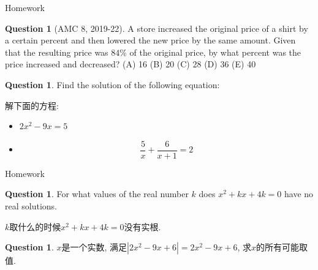 \documentclass{beamer}
\theoremstyle{definition}
\newtheorem{ques}[defn]{Question}
\begin{document}


\begin{frame}{Homework}
    \begin{ques}[AMC 8, 2019-22]
        A store increased the original price of a shirt by a certain percent and then lowered the new price by the same amount. Given that the resulting price was $84 \%$ of the original price, by what percent was the price increased and decreased?
         (A) 16 (B) 20 (C) 28 (D) 36 (E) 40
    \end{ques}
    \begin{ques}
        Find the solution of the following equation:

        解下面的方程:
        \begin{itemize}
            \item $2x^2-9x=5$
            \item
                  \begin{equation*}
                      \frac{5}{x}+\frac{6}{x+1}=2
                  \end{equation*}
        \end{itemize}
    \end{ques}
\end{frame}
\begin{frame}{Homework}
    \begin{ques}
        For what values of the real number $k$ does $x^2+kx+4k=0$ have no real solutions.

        $k$取什么的时候$x^2+kx+4k=0$没有实根.
    \end{ques}
    \begin{ques}
        $x$是一个实数, 满足$|2x^2-9x+6|=2x^2-9x+6$, 求$x$的所有可能取值.
     \end{ques}
\end{frame}
\end{document}
